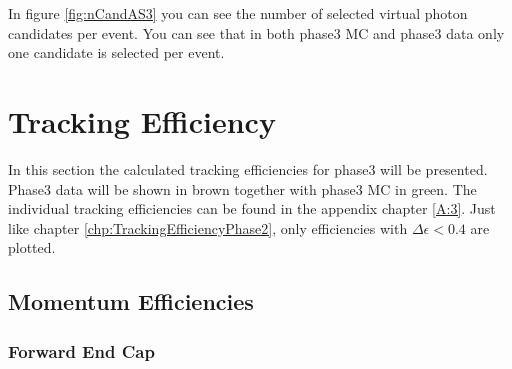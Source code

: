 \documentclass[a4paper,11pt,twosided,final,german,openbib,pdftex,listof=totoc,bibliography=totoc]{scrbook}
\begin{document}
In figure \ref{fig:nCandAS3} you can see the number of selected virtual photon candidates per event. You can see that in both phase3 MC and phase3 data only one candidate is selected per event.










\newpage

\section{Tracking Efficiency}

In this section the calculated tracking efficiencies for phase3 will be presented.  Phase3 data will be shown in brown together with phase3 MC in green. The individual tracking efficiencies can be found in the appendix chapter \ref{A:3}. Just like chapter \ref{chp:TrackingEfficiencyPhase2}, only efficiencies with $\Delta \epsilon < 0.4$ are plotted.


\subsection{Momentum Efficiencies}


\subsubsection{Forward End Cap}
\end{document}
